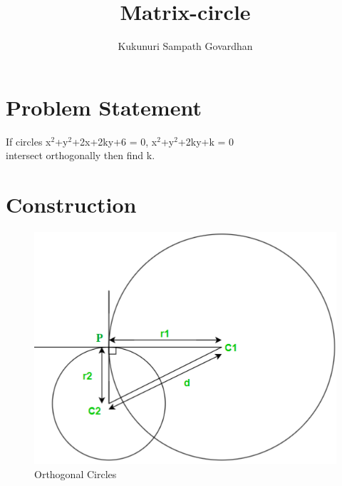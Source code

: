 \documentclass[journal,12pt,twocolumn]{IEEEtran}
\title{
Matrix-circle
}
\author{Kukunuri Sampath Govardhan}
\begin{document}
\maketitle
\tableofcontents
\section{Problem Statement}
\begin{flushleft}
    If circles x$^2$+y$^2$+2x+2ky+6 = 0,  x$^2$+y$^2$+2ky+k = 0\\
intersect orthogonally then find k.\\
\end{flushleft}
\section{Construction}
\begin{figure}[h]
    \centering
\includegraphics[width=\columnwidth]{figs/Assignment5.png}
    \caption{Orthogonal Circles}
    \label{fig:my_label}
\end{figure}
\end{document}
